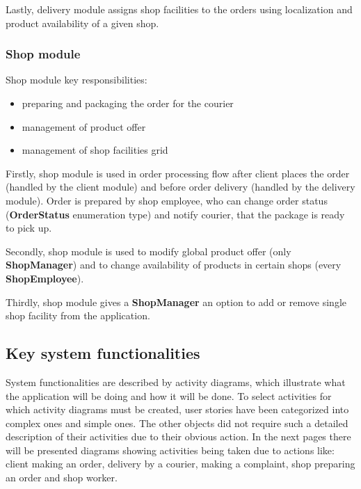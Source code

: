 \documentclass[../main.tex]{subfiles}
\begin{document}
Lastly, delivery module assigns shop facilities to the orders using localization and product availability of a given shop.


\subsubsection{Shop module}

Shop module key responsibilities: 
\begin{itemize}
  \item preparing and packaging the order for the courier
  \item management of product offer
  \item management of shop facilities grid
\end{itemize}

Firstly, shop module is used in order processing flow after client places the order (handled by the client module) and before order delivery (handled by the delivery module). Order is prepared by shop employee, who can change order status (\textbf{OrderStatus} enumeration type) and notify courier, that the package is ready to pick up.

Secondly, shop module is used to modify global product offer (only \textbf{ShopManager}) and to change availability of products in certain shops (every \textbf{ShopEmployee}).

Thirdly, shop module gives a \textbf{ShopManager} an option to add or remove single shop facility from the application.


\subsection{Key system functionalities}
System functionalities are described by activity diagrams, which illustrate what the application will be doing and how it will be done.
To select activities for which activity diagrams must be created, user stories have been categorized into complex ones and simple ones. The other objects did not require such a detailed description of their activities due to their obvious action.
In the next pages there will be presented diagrams showing activities being taken due to actions like: client making an order, delivery by a courier, making a complaint, shop preparing an order and shop worker.
\end{document}
